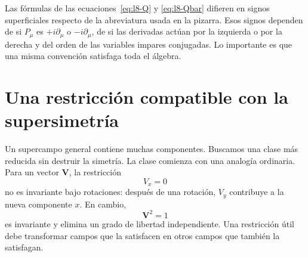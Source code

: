 \begin{classroomqa}
\end{classroomqa}

\begin{classroomqa}
\end{classroomqa}

Las fórmulas de las ecuaciones~\eqref{eq:l8-Q} y \eqref{eq:l8-Qbar} difieren en signos superficiales respecto de la abreviatura usada en la pizarra. Esos signos dependen de si \(P_\mu\) es \(+i\partial_\mu\) o \(-i\partial_\mu\), de si las derivadas actúan por la izquierda o por la derecha y del orden de las variables impares conjugadas. Lo importante es que una misma convención satisfaga toda el álgebra.

\section{Una restricción compatible con la supersimetría}

Un supercampo general contiene muchas componentes. Buscamos una clase más reducida sin destruir la simetría. La clase comienza con una analogía ordinaria. Para un vector \(\mathbf V\), la restricción
\begin{equation}
V_x=0
\end{equation}
no es invariante bajo rotaciones: después de una rotación, \(V_y\) contribuye a la nueva componente \(x\). En cambio,
\begin{equation}
\mathbf V^2=1
\end{equation}
es invariante y elimina un grado de libertad independiente. Una restricción útil debe transformar campos que la satisfacen en otros campos que también la satisfagan.

